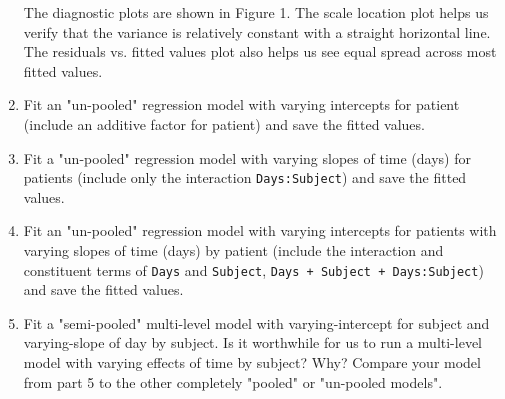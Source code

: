 \documentclass[12pt,letterpaper]{article}
\begin{document}
\begin{enumerate}
	The diagnostic plots are shown in Figure 1. The scale location plot helps us verify that the variance is relatively constant with a straight horizontal line. The residuals vs. fitted values plot also helps us see equal spread across most fitted values.
	
	\item Fit an "un-pooled" regression model with varying intercepts for patient (include an additive factor for patient) and save the fitted values.
	
	  
	
	\item Fit a "un-pooled" regression model with varying slopes of time (days) for patients (include only the interaction \texttt{Days:Subject}) and save the fitted values.
	
	  
	
	\item Fit an "un-pooled" regression model with varying intercepts for patients with varying slopes of time (days) by patient (include the interaction and constituent terms of \texttt{Days} and \texttt{Subject}, \texttt{Days + Subject + Days:Subject}) and save the fitted values.
	
	  
	
	\item Fit a "semi-pooled" multi-level model with varying-intercept for subject and varying-slope of day by subject. Is it worthwhile for us to run a multi-level model with varying effects of time by subject? Why? Compare your model from part 5 to the other completely "pooled" or "un-pooled models".
	
	  
	

\end{enumerate}
\end{document}

